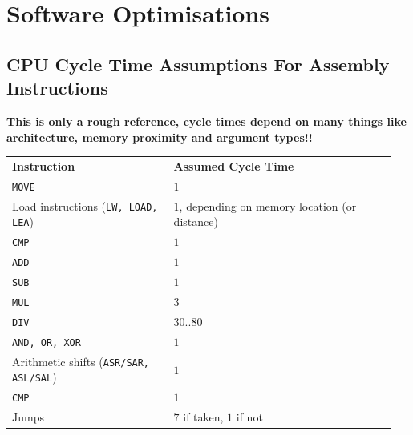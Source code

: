 \section{Software Optimisations }
	
	\subsection{CPU Cycle Time Assumptions For Assembly Instructions}
		{\color{red}\textbf{This is only a rough reference, cycle times depend on many things like architecture, memory proximity and argument types!!}}
		
		\begin{longtable}{|p{0.4\linewidth}|p{0.55\linewidth}|}
				\hline
				\textbf{Instruction}
					& \textbf{Assumed Cycle Time}\\
				\hhline{|=|=|}
				\texttt{MOVE}
					& $1$\\
				\hline
				Load instructions (\texttt{LW, LOAD, LEA})
					& $1$, depending on memory location (or distance)\\
				\hline
				\texttt{CMP}
					& $1$\\
				\hline
				\texttt{ADD}
					& $1$\\
				\hline
				\texttt{SUB}
					& $1$\\
				\hline
				\texttt{MUL}
					& $3$\\
				\hline
				\texttt{DIV}
					& $30..80$\\
				\hline
				\texttt{AND, OR, XOR}
					& $1$\\
				\hline
				Arithmetic shifts (\texttt{ASR/SAR, ASL/SAL})
					& $1$\\
				\hline
				\texttt{CMP}
					& $1$\\
				\hline
				Jumps 
					& $7$ if taken, $1$ if not\\
				\hline
		\end{longtable}
	
